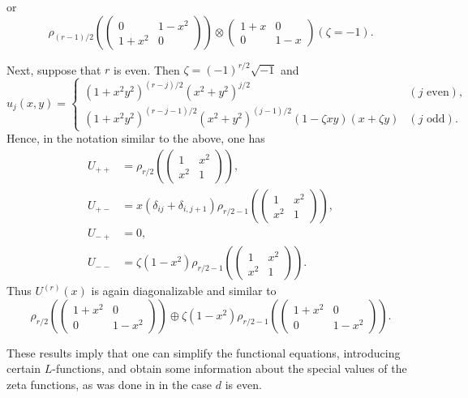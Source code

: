 or
$$
\rho_{(r-1)/2}\left(\left(
\begin{matrix}
0 & 1-x^{2}\\
1+x^{2} & 0
\end{matrix}
\right)\right)\otimes
\left(
\begin{matrix}
1+x & 0\\
0 & 1-x
\end{matrix}
\right)(\zeta=-1).
$$

Next, suppose that $r$ is even. Then $\zeta=(-1)^{r/2}\sqrt{-1}$ and 
\begin{equation}
u_{j}(x,y)=
\begin{cases}
(1+x^{2}y^{2})^{(r-j)/2}(x^{2}+y^{2})^{j/2} & (j\text{~even}),\\
(1+x^{2}y^{2})^{(r-j-1)/2}(x^{2}+y^{2})^{(j-1)/2}(1-\zeta xy)(x+\zeta y) & (j\text{~odd}).
\end{cases}\label{art11-eq32}
\end{equation}\pageoriginale
Hence, in the notation similar to the above, one has
\begin{align*}
U_{++} &= \rho_{r/2}\left(\left(
\begin{matrix}
1 & x^{2}\\
x^{2} & 1
\end{matrix}
\right)\right),\\
U_{+-} &= x(\delta_{ij}+\delta_{i,j+1})\rho_{r/2-1}\left(\left(
\begin{matrix}
1 & x^{2}\\
x^{2} & 1
\end{matrix}
\right)\right),\\
U_{-+} &= 0,\\
U_{--} &= \zeta(1-x^{2})\rho_{r/2-1}
\left(\left(
\begin{matrix}
1 & x^{2}\\
x^{2} & 1
\end{matrix}
\right)\right).
\end{align*}
Thus $U^{(r)}(x)$ is again diagonalizable and similar to
$$
\rho_{r/2}\left(\left(
\begin{matrix}
1+x^{2} & 0\\
0 & 1-x^{2}
\end{matrix}
\right)\right)
\oplus
\zeta(1-x^{2})\rho_{r/2-1}\left(\left(
\begin{matrix}
1+x^{2} & 0\\
0 & 1-x^{2}
\end{matrix}
\right)\right).
$$

These results imply that one can simplify the functional equations, introducing certain $L$-functions, and obtain some information about the special values of the zeta functions, as was done in \cite{art11-keySO} in the case $d$ is even.

